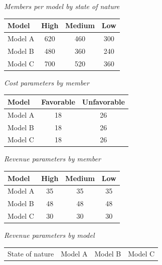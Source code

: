 \begin{ExamProblems}
		\begin{center}
			\textit{Members per model by state of nature}\\
			\begin{tabular}{l c c c}
				\toprule
				Model & High & Medium & Low \\
				\midrule
				Model A & 620 & 460 & 300 \\
				Model B & 480 & 360 & 240 \\
				Model C & 700 & 520 & 360 \\
				\bottomrule
		\end{tabular}
		\end{center}
		\begin{center}
			\begin{minipage}[t]{0.48\linewidth}
				\textit{Cost parameters by member}
				\begin{center}
					\begin{tabular}{l c c}
						\toprule
						Model & Favorable & Unfavorable \\
						\midrule
						Model A & 18 & 26 \\
						Model B & 18 & 26 \\
						Model C & 18 & 26 \\
						\bottomrule
					\end{tabular}
				\end{center}
			\end{minipage}
			\hfill
			\begin{minipage}[t]{0.48\linewidth}
				\textit{Revenue parameters by member}
				\begin{center}
					\begin{tabular}{l c c c}
						\toprule
						Model & High & Medium & Low \\
						\midrule
						Model A & 35 & 35 & 35 \\
						Model B & 48 & 48 & 48 \\
						Model C & 30 & 30 & 30 \\
						\bottomrule
					\end{tabular}
				\end{center}
			\end{minipage}
		\end{center}
		\begin{center}
			\textit{Revenue parameters by model} \\
			\begin{tabular}{l c c c}
				\toprule
				State of nature & Model A & Model B & Model C \\

\end{tabular}
\end{center}
\end{ExamProblems}
